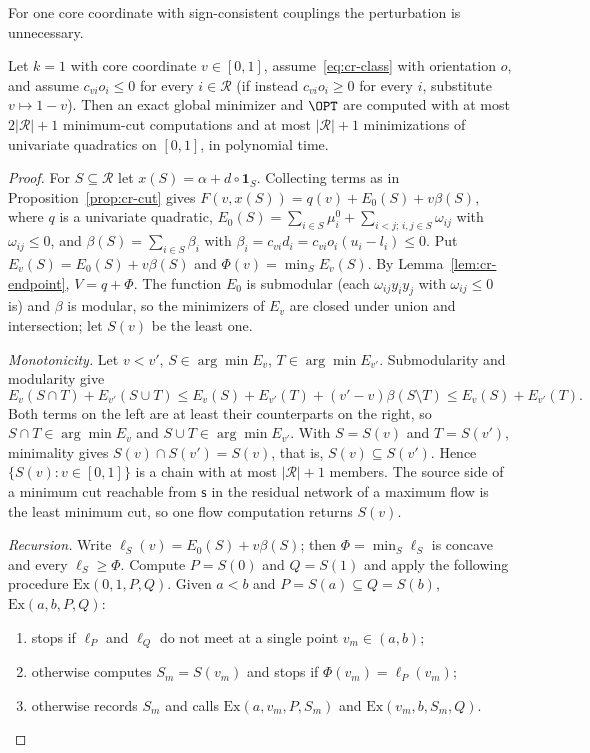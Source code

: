 For one core coordinate with sign-consistent couplings the
perturbation is unnecessary.

\begin{proposition}\label{prop:cr-k1}
Let $k=1$ with core coordinate $v\in[0,1]$, assume~\eqref{eq:cr-class}
with orientation $o$, and assume $c_{vi}o_i\le0$ for every $i\in\mathcal R$
(if instead $c_{vi}o_i\ge0$ for every $i$, substitute $v\mapsto1-v$).
Then an exact global minimizer and $\OPT$ are computed with at most
$2|\mathcal R|+1$ minimum-cut computations and at most $|\mathcal R|+1$
minimizations of univariate quadratics on $[0,1]$, in polynomial time.
\end{proposition}
\begin{proof}
For $S\subseteq\mathcal R$ let $x(S)=\alpha+d\circ\mathbf 1_S$. Collecting
terms as in Proposition~\ref{prop:cr-cut} gives
$F(v,x(S))=q(v)+E_0(S)+v\beta(S)$, where $q$ is a univariate quadratic,
$E_0(S)=\sum_{i\in S}\mu^0_i+\sum_{i<j;\,i,j\in S}\omega_{ij}$ with
$\omega_{ij}\le0$, and $\beta(S)=\sum_{i\in S}\beta_i$ with
$\beta_i=c_{vi}d_i=c_{vi}o_i(u_i-l_i)\le0$. Put
$E_v(S)=E_0(S)+v\beta(S)$ and $\Phi(v)=\min_SE_v(S)$. By
Lemma~\ref{lem:cr-endpoint}, $V=q+\Phi$. The function $E_0$ is submodular
(each $\omega_{ij}y_iy_j$ with $\omega_{ij}\le0$ is) and $\beta$ is
modular, so the minimizers of $E_v$ are closed under union and
intersection; let $S(v)$ be the least one.

\emph{Monotonicity.} Let $v<v'$, $S\in\arg\min E_v$, $T\in\arg\min E_{v'}$.
Submodularity and modularity give
\[
E_v(S\cap T)+E_{v'}(S\cup T)\le E_v(S)+E_{v'}(T)+(v'-v)\beta(S\setminus T)
\le E_v(S)+E_{v'}(T).
\]
Both terms on the left are at least their counterparts on the right, so
$S\cap T\in\arg\min E_v$ and $S\cup T\in\arg\min E_{v'}$. With $S=S(v)$
and $T=S(v')$, minimality gives $S(v)\cap S(v')=S(v)$, that is,
$S(v)\subseteq S(v')$. Hence $\{S(v):v\in[0,1]\}$ is a chain with at most
$|\mathcal R|+1$ members. The source side of a minimum cut reachable from
$\mathsf s$ in the residual network of a maximum flow is the least
minimum cut, so one flow computation returns $S(v)$.

\emph{Recursion.} Write $\ell_S(v)=E_0(S)+v\beta(S)$; then
$\Phi=\min_S\ell_S$ is concave and every $\ell_S\ge\Phi$. Compute
$P=S(0)$ and $Q=S(1)$ and apply the following procedure
$\mathrm{Ex}(0,1,P,Q)$. Given $a<b$ and $P=S(a)\subseteq Q=S(b)$,
$\mathrm{Ex}(a,b,P,Q)$:
\begin{enumerate}
\item stops if $\ell_P$ and $\ell_Q$ do not meet at a single point
$v_m\in(a,b)$;
\item otherwise computes $S_m=S(v_m)$ and stops if
$\Phi(v_m)=\ell_P(v_m)$;
\item otherwise records $S_m$ and calls $\mathrm{Ex}(a,v_m,P,S_m)$ and
$\mathrm{Ex}(v_m,b,S_m,Q)$.
\end{enumerate}


\end{proof}
